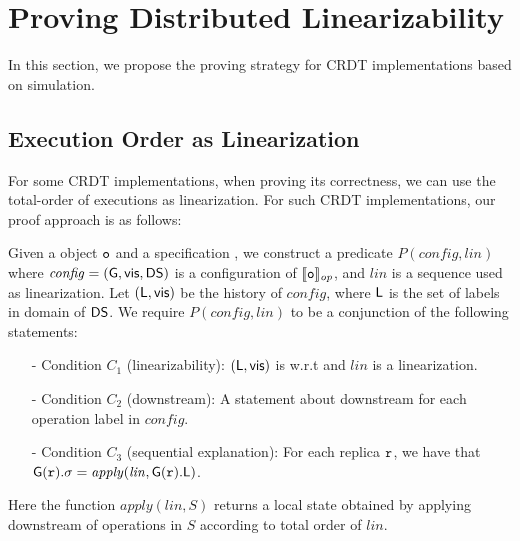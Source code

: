 
\section{Proving Distributed Linearizability}
\label{sec:proving distributed linearizability}

In this section, we propose the proving strategy for CRDT implementations based on simulation.



\subsection{Execution Order as Linearization}
\label{subsec:time order of execution as linearization}


For some CRDT implementations, when proving its correctness, we can use the total-order of executions as linearization. For such CRDT implementations, our proof approach is as follows: 


Given a object $\mathtt{o}$ and a specification \Spec{}, we construct a predicate $P(\mathit{config},\mathit{lin})$ where $\mathit{config} = (\mathsf{G}, \mathsf{vis}, \mathsf{DS})$ is a configuration of $\llbracket \mathtt{o} \rrbracket_{\mathit{op}}$, and $\mathit{lin}$ is a sequence used as linearization. Let $(\mathsf{L}, \mathsf{vis})$ be the history of $\mathit{config}$, where $\mathsf{L}$ is the set of labels in domain of $\mathsf{DS}$. We require $P(\mathit{config},\mathit{lin})$ to be a conjunction of the following statements:

\begin{itemize}
\setlength{\itemsep}{0.5pt}
\item[-] Condition $C_1$ (linearizability): $(\mathsf{L}, \mathsf{vis})$ is \crdtlinearizable{} w.r.t \Spec{} and $\mathit{lin}$ is a linearization. 

\item[-] Condition $C_2$ (downstream): A statement about downstream for each operation label in $\mathit{config}$. 

\item[-] Condition $C_3$ (sequential explanation): For each replica $\mathtt{r}$, we have that $\mathsf{G}(\mathtt{r}).\sigma = \mathit{apply}(\mathit{lin},\mathsf{G}(\mathtt{r}).\mathsf{L})$.
\end{itemize}

Here the function $\mathit{apply}(\mathit{lin},S)$ returns a local state obtained by applying downstream of operations in $S$ according to total order of $\mathit{lin}$. 

